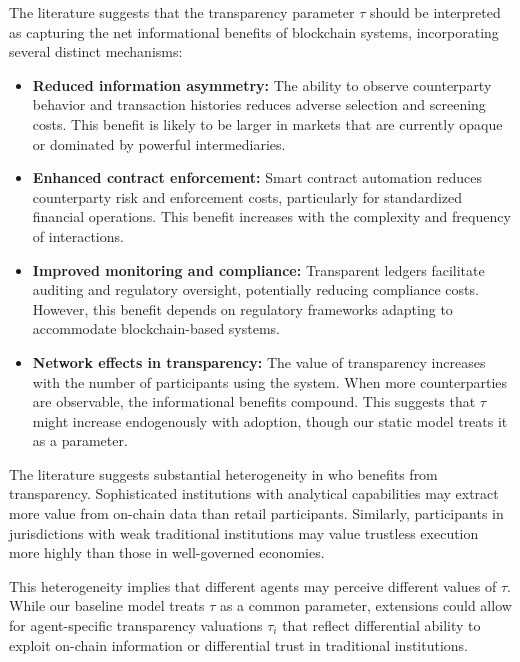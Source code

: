The literature suggests that the transparency parameter $\tau$ should be interpreted as capturing the net informational benefits of blockchain systems, incorporating several distinct mechanisms:

\begin{itemize}
    \item \textbf{Reduced information asymmetry:} The ability to observe counterparty behavior and transaction histories reduces adverse selection and screening costs. This benefit is likely to be larger in markets that are currently opaque or dominated by powerful intermediaries.
    
    \item \textbf{Enhanced contract enforcement:} Smart contract automation reduces counterparty risk and enforcement costs, particularly for standardized financial operations. This benefit increases with the complexity and frequency of interactions.
    
    \item \textbf{Improved monitoring and compliance:} Transparent ledgers facilitate auditing and regulatory oversight, potentially reducing compliance costs. However, this benefit depends on regulatory frameworks adapting to accommodate blockchain-based systems.
    
    \item \textbf{Network effects in transparency:} The value of transparency increases with the number of participants using the system. When more counterparties are observable, the informational benefits compound. This suggests that $\tau$ might increase endogenously with adoption, though our static model treats it as a parameter.
\end{itemize}

The literature suggests substantial heterogeneity in who benefits from transparency. Sophisticated institutions with analytical capabilities may extract more value from on-chain data than retail participants. Similarly, participants in jurisdictions with weak traditional institutions may value trustless execution more highly than those in well-governed economies.

This heterogeneity implies that different agents may perceive different values of $\tau$. While our baseline model treats $\tau$ as a common parameter, extensions could allow for agent-specific transparency valuations $\tau_i$ that reflect differential ability to exploit on-chain information or differential trust in traditional institutions.

